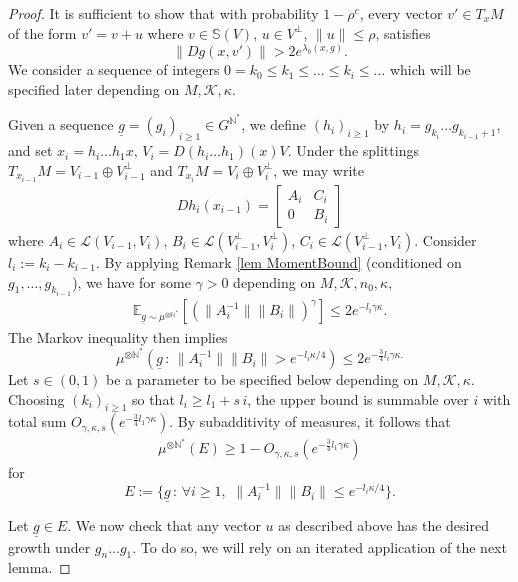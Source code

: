 \documentclass[11pt, leqno, fleqn]{amsart}
\newcommand{\margem}[1]{\marginpar{{\scriptsize {#1}}}}
\def\clo{   \color{orange}}
\def \N{{\mathbb N}}
\newcommand{\EV}{{\mathbb E}}
\newcommand{\cK}{{\mathcal K}}
\newcommand{\ary}{\begin{eqnarray}}
\newcommand{\eary}{\end{eqnarray}}
\newcommand{\aryst}{\begin{eqnarray*}}
\newcommand{\earyst}{\end{eqnarray*}}
\theoremstyle{definition}
\theoremstyle{definition}
\def\cL{\mathcal{L}}
\def\S{ {\mathbb{S}} }
\newcommand{\ug}{{\underline g}}
\begin{document}
		 \begin{proof} 
		 
		 It is sufficient to show that with probability $1-\rho^{c}$, every vector $  v'   \in T_{x}M$ of the form 
		 $v'=v+u$ where $v\in \S(V)$,  $u\in V^\perp$, $\|u\|\leq \rho$, satisfies
		 $$ \|D g(x,v')\| > 2 e^{\lambda_{b}(x,g)}.$$
		 We consider a sequence of integers $0=k_{0}\leq k_{1}\leq \dots\leq k_{i}\leq \dots$ which will be specified later depending on $M, \cK,\kappa$.   		


		 Given a sequence $\ug=(g_{i})_{i\geq1}\in G^{\N^*}$, we define $(h_{i})_{i\geq 1}$ by $h_{i}=g_{k_{i}}\dots g_{k_{i-1}+1}$, and   set $x_{i}=h_{i}\dots h_{1}x$,  $V_{i}=D(h_{i}\dots h_{1})(x)V$. 
Under the splittings $T_{x_{i-1}} M = V_{i-1} \oplus V_{i-1}^{\perp}$ and $ T_{x_{i}} M = V_{i} \oplus V_{i}^{\perp}$, we may write 
		 	\aryst
		 	D h_{i}(x_{i-1})= \begin{bmatrix}
		 		A_i & C_i \\ 0 & B_i
		 	\end{bmatrix}
		 	\earyst
where $A_i \in \cL(V_{i-1},V_{i})$, $B_i \in \cL(V^\perp_{i-1},V^\perp_{i})$, $C_i \in \cL(V^\perp_{i-1},V_{i})$.
Consider $l_{i}:=k_{i}-k_{i-1}$.  By applying  Remark \ref{lem MomentBound} (conditioned on $g_{1},\dots,g_{k_{i-1}}$),  we have  for some $\gamma>0$ depending on $M, \cK, n_{0}, \kappa$,
\aryst
\EV_{\ug\sim \mu^{\otimes \N^*}}[(\| A_i^{-1} \| \| B_i \|)^{\gamma}] \leq   2 e^{ - l_{i} \gamma \kappa }.
\earyst 
The Markov inequality then implies 
$$ 
\mu^{\otimes \N^*}(\ug\,:\,  \| A_i^{-1} \| \| B_i \| > e^{ - l_{i} \kappa / 4}) \leq 2e^{ - \frac{3}{4}l_{i}\gamma \kappa. }
$$
Let $s\in (0, 1)$ be a parameter to be specified below depending on $M, \cK,\kappa$.  
Choosing $(k_{i})_{i\geq 1}$ so that $l_{i}\geq l_{1}+  s\, i $, the upper bound is summable over $i$ with total sum $O_{\gamma,\kappa, s}(e^{- \frac{3}{4} l_{1}\gamma \kappa })$. By  subadditivity of measures, it follows that 
\ary\label{Esize}
\mu^{\otimes \N^*}(E)\geq 1- O_{\gamma, \kappa, s}(e^{- \frac{3}{4}l_{1}\gamma \kappa }) 
\eary
for 
$$E:=\{\ug\,:\, \forall i\geq 1,\,\, \| A_i^{-1} \| \| B_i \| \leq e^{ - l_{i} \kappa / 4}\}.$$


Let $\ug\in E$. We now check that any  vector $u$ as described above has the desired growth under $g_{n}\dots g_{1}$. To do so, we will rely on an iterated application of the next lemma.
		 

\end{proof}
\end{document}
